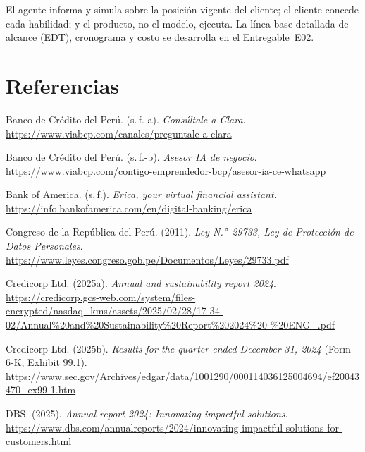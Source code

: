 \documentclass[11pt,a4paper]{article}
\begin{document}
El agente informa y simula sobre la posición vigente del cliente; el cliente concede cada habilidad; y el producto, no el modelo, ejecuta. La línea base detallada de alcance (EDT), cronograma y costo se desarrolla en el Entregable~E02.

\clearpage
\section*{Referencias}

{\small
\setlength{\parskip}{0.55em}
\raggedright
\begin{list}{}{\setlength{\leftmargin}{1.2em}\setlength{\itemindent}{-1.2em}\setlength{\itemsep}{0.55em}}

\item Banco de Crédito del Perú. (s.\,f.-a). \textit{Consúltale a Clara}. \url{https://www.viabcp.com/canales/preguntale-a-clara}

\item Banco de Crédito del Perú. (s.\,f.-b). \textit{Asesor IA de negocio}. \url{https://www.viabcp.com/contigo-emprendedor-bcp/asesor-ia-ce-whatsapp}

\item Bank of America. (s.\,f.). \textit{Erica, your virtual financial assistant}. \url{https://info.bankofamerica.com/en/digital-banking/erica}

\item Congreso de la República del Perú. (2011). \textit{Ley N.°~29733, Ley de Protección de Datos Personales}. \url{https://www.leyes.congreso.gob.pe/Documentos/Leyes/29733.pdf}

\item Credicorp Ltd. (2025a). \textit{Annual and sustainability report 2024}. \url{https://credicorp.gcs-web.com/system/files-encrypted/nasdaq_kms/assets/2025/02/28/17-34-02/Annual%20and%20Sustainability%20Report%202024%20-%20ENG_.pdf}

\item Credicorp Ltd. (2025b). \textit{Results for the quarter ended December 31, 2024} (Form 6-K, Exhibit 99.1). \url{https://www.sec.gov/Archives/edgar/data/1001290/000114036125004694/ef20043470_ex99-1.htm}

\item DBS. (2025). \textit{Annual report 2024: Innovating impactful solutions}. \url{https://www.dbs.com/annualreports/2024/innovating-impactful-solutions-for-customers.html}


\end{list}}
\end{document}
